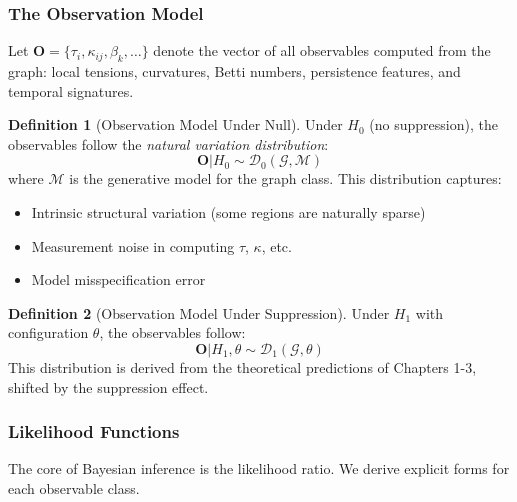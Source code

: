 \documentclass[12pt,a4paper]{article}
\theoremstyle{definition}
\newtheorem{definition}{Definition}[section]
\theoremstyle{remark}
\newcommand{\Graph}{\mathcal{G}}         %
\begin{document}
\subsubsection{The Observation Model}

Let $\mathbf{O} = \{\tau_i, \kappa_{ij}, \beta_k, \ldots\}$ denote the vector of all observables computed from the graph: local tensions, curvatures, Betti numbers, persistence features, and temporal signatures.

\begin{definition}[Observation Model Under Null]
Under $H_0$ (no suppression), the observables follow the \emph{natural variation distribution}:
\begin{equation}
    \mathbf{O} | H_0 \sim \mathcal{D}_0(\Graph, \mathcal{M})
\end{equation}
where $\mathcal{M}$ is the generative model for the graph class. This distribution captures:
\begin{itemize}
    \item Intrinsic structural variation (some regions are naturally sparse)
    \item Measurement noise in computing $\tau$, $\kappa$, etc.
    \item Model misspecification error
\end{itemize}
\end{definition}

\begin{definition}[Observation Model Under Suppression]
Under $H_1$ with configuration $\theta$, the observables follow:
\begin{equation}
    \mathbf{O} | H_1, \theta \sim \mathcal{D}_1(\Graph, \theta)
\end{equation}
This distribution is derived from the theoretical predictions of Chapters 1-3, shifted by the suppression effect.
\end{definition}

\subsubsection{Likelihood Functions}

The core of Bayesian inference is the likelihood ratio. We derive explicit forms for each observable class.
\end{document}
